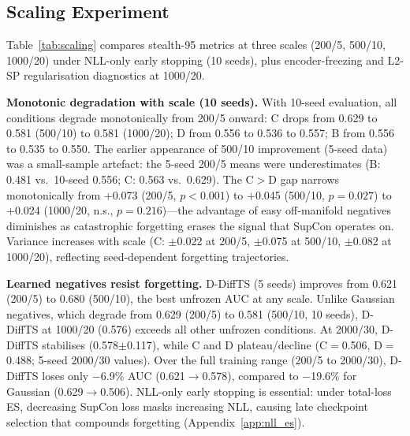 \subsection{Scaling Experiment}
\label{sec:experiments:scaling}

Table~\ref{tab:scaling} compares stealth-95 metrics at three scales
(200/5, 500/10, 1000/20) under NLL-only early stopping (10 seeds),
plus encoder-freezing and L2-SP regularisation diagnostics at 1000/20.



\textbf{Monotonic degradation with scale (10 seeds).}
With 10-seed evaluation, all conditions degrade monotonically from
200/5 onward: C drops from 0.629 to 0.581 (500/10) to 0.581 (1000/20);
D from 0.556 to 0.536 to 0.557; B from 0.556 to 0.535 to 0.550.
The earlier appearance of 500/10 improvement (5-seed data) was a
small-sample artefact: the 5-seed 200/5 means were underestimates
(B: 0.481 vs.\ 10-seed 0.556; C: 0.563 vs.\ 0.629).
The C$>$D gap narrows monotonically from $+$0.073 (200/5, $p{<}0.001$)
to $+$0.045 (500/10, $p{=}0.027$)
to $+$0.024 (1000/20, n.s., $p{=}0.216$)---the advantage of easy
off-manifold negatives diminishes as catastrophic forgetting erases
the signal that SupCon operates on.
Variance increases with scale (C: $\pm$0.022 at 200/5, $\pm$0.075 at
500/10, $\pm$0.082 at 1000/20), reflecting seed-dependent forgetting
trajectories.

\textbf{Learned negatives resist forgetting.}
D-DiffTS (5 seeds) improves from 0.621 (200/5) to 0.680 (500/10), the best
unfrozen AUC at any scale.  Unlike Gaussian negatives, which degrade from
0.629 (200/5) to 0.581 (500/10, 10 seeds), D-DiffTS at 1000/20
(0.576) exceeds all other unfrozen conditions.
At 2000/30, D-DiffTS stabilises (0.578$\pm$0.117), while C and D
plateau/decline (C$=$0.506, D$=$0.488; 5-seed 2000/30 values).
Over the full training range (200/5 to 2000/30), D-DiffTS loses only
$-$6.9\% AUC (0.621$\to$0.578), compared to $-$19.6\% for
Gaussian (0.629$\to$0.506).
NLL-only early stopping is essential: under total-loss ES, decreasing SupCon loss masks increasing NLL, causing late checkpoint selection that compounds forgetting (Appendix~\ref{app:nll_es}).

